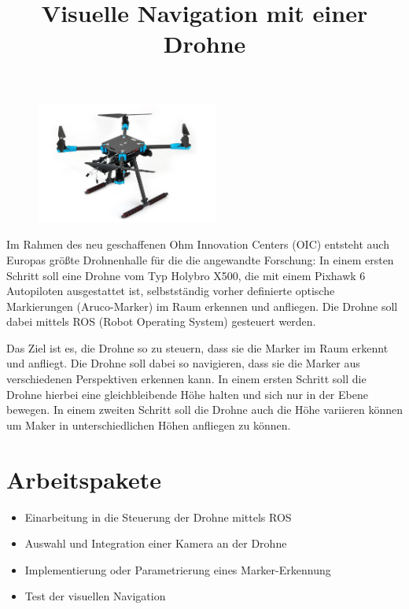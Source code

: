 \documentclass[a4paper,11pt]{article}
\title{\textcolor{ohm_red}{Visuelle Navigation mit einer Drohne}}
\date{}
\begin{document}
\maketitle
\thispagestyle{fancy}

\vspace*{-3cm}
\begin{figure}[h!]
    \centering
    \includegraphics[height=4cm]{img/holybro_x500.png}
\end{figure}


Im Rahmen des neu geschaffenen Ohm Innovation Centers (OIC) entsteht auch Europas größte Drohnenhalle für die die angewandte Forschung: 
In einem ersten Schritt soll eine Drohne vom Typ Holybro X500, die mit einem Pixhawk 6 Autopiloten ausgestattet ist, 
selbstständig vorher definierte optische Markierungen (Aruco-Marker) im Raum erkennen und anfliegen. Die Drohne soll dabei mittels ROS (Robot Operating System) gesteuert werden. 

Das Ziel ist es, die Drohne so zu steuern, dass sie die Marker im Raum erkennt und anfliegt. 
Die Drohne soll dabei so navigieren, dass sie die Marker aus verschiedenen Perspektiven erkennen kann. 
In einem ersten Schritt soll die Drohne hierbei eine gleichbleibende Höhe halten und sich nur in der Ebene bewegen. In einem zweiten Schritt soll die Drohne auch die Höhe variieren können um Maker in unterschiedlichen Höhen anfliegen zu können. 

\section*{Arbeitspakete}
\begin{itemize}[leftmargin=0.5cm]
    \item Einarbeitung in die Steuerung der Drohne mittels ROS
    \item Auswahl und Integration einer Kamera an der Drohne
    \item Implementierung oder Parametrierung eines Marker-Erkennung
    \item Test der visuellen Navigation 
\end{itemize}
\end{document}
